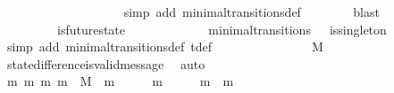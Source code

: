 \begin{isabellebody}
\ \ \ \ \isamarkupfalse%
\ \isamarkupfalse%
\ {\isachardoublequoteopen}{\isasymsigma}{\isacharprime}\ {\isacharminus}\ {\isasymsigma}\ {\isasymnoteq}\ {\isasymemptyset}{\isachardoublequoteclose}\isanewline
\ \ \ \ \ \ \isamarkupfalse%
\ {\isacharparenleft}simp\ add{\isacharcolon}\ minimal{\isacharunderscore}transitions{\isacharunderscore}def{\isacharparenright}\isanewline
\ \ \ \ \ \ \isamarkupfalse%
\ blast\isanewline
\ \ \ \ \isamarkupfalse%
\ {\isachardoublequoteopen}{\isasymsigma}{\isacharprime}\ {\isasymin}\ {\isasymSigma}\ {\isasymand}\ {\isasymsigma}\ {\isasymin}\ {\isasymSigma}\ {\isasymand}\ is{\isacharunderscore}future{\isacharunderscore}state\ {\isacharparenleft}{\isasymsigma}{\isacharcomma}\ {\isasymsigma}{\isacharprime}{\isacharparenright}{\isachardoublequoteclose}\isanewline
\ \ \ \ \ \ \isamarkupfalse%
\ {\isacartoucheopen}{\isacharparenleft}{\isasymsigma}{\isacharcomma}\ {\isasymsigma}{\isacharprime}{\isacharparenright}\ {\isasymin}\ minimal{\isacharunderscore}transitions\ {\isasymand}\ {\isasymnot}\ is{\isacharunderscore}singleton\ {\isacharparenleft}{\isasymsigma}{\isacharprime}\ {\isacharminus}\ {\isasymsigma}{\isacharparenright}{\isacartoucheclose}\isanewline
\ \ \ \ \ \ \isamarkupfalse%
\ {\isacharparenleft}simp\ add{\isacharcolon}\ minimal{\isacharunderscore}transitions{\isacharunderscore}def\ {\isasymSigma}t{\isacharunderscore}def{\isacharparenright}\ \ \ \ \isanewline
\ \ \ \ \isamarkupfalse%
\ \isamarkupfalse%
\ {\isachardoublequoteopen}{\isasymsigma}{\isacharprime}\ {\isacharminus}\ {\isasymsigma}\ {\isasymsubseteq}\ M{\isachardoublequoteclose}\isanewline
\ \ \ \ \ \ \isamarkupfalse%
\ state{\isacharunderscore}difference{\isacharunderscore}is{\isacharunderscore}valid{\isacharunderscore}message\ \isamarkupfalse%
\ auto\ \ \ \ \ \ \isanewline
\ \ \ \ \isamarkupfalse%
\ \isamarkupfalse%
\ {\isachardoublequoteopen}{\isasymexists}m{}\ m{}{\isachardot}\ {\isacharbraceleft}m{}{\isacharcomma}\ m{}{\isacharbraceright}\ {\isasymsubseteq}\ M\ {\isasymand}\ m{}\ {\isasymin}\ {\isasymsigma}{\isacharprime}\ {\isacharminus}\ {\isasymsigma}\ {\isasymand}\ m{}\ {\isasymin}\ {\isasymsigma}{\isacharprime}\ {\isacharminus}\ {\isasymsigma}\ {\isasymand}\ m{}\ {\isasymnoteq}\ m{}{\isachardoublequoteclose}\isanewline
\ \ \ \ \ \ \isamarkupfalse%

\end{isabellebody}
